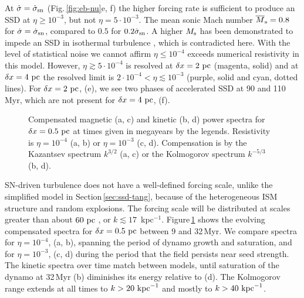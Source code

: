 \documentclass[preprint2]{aastex63}
\newcommand\SNr{\dot\sigma_{\rm sn}}
\newcommand\Ms{M_{\rm s}}
\newcommand\kpc{~ {\rm kpc}}
\newcommand\pc{~ {\rm pc}}
\newcommand\dx{ {\delta x}}
\begin{document}
 At $\dot\sigma=\SNr$ (Fig.\,\ref{fig:eb-nu}e, f) the higher forcing
 rate is sufficient to produce an SSD at $\eta\geq10^{-3}$, but not $\eta=5\cdot10^{-3}$.
     The mean sonic
 Mach number $\overline\Ms=0.8$ for $\dot\sigma=\SNr$,
 compared to $0.5$ for $0.2\SNr$.
 A higher $\Ms$ has been demonstrated to impede an SSD in isothermal turbulence
 \citep{Haugen:2004M}, which is contradicted here.
 With the level of statistical noise we cannot affirm $\eta\leq10^{-4}$
     exceeds numerical resistivity in this model. 
 However, $\eta\gtrsim5\cdot10^{-4}$ is
 resolved at $\dx=2\pc$ (magenta, solid) and 
 at $\dx=4\pc$ the resolved limit is $2\cdot10^{-4}<\eta\lesssim10^{-3}$
 (purple, solid and cyan, dotted lines).
 For $\dx=2\pc$, (e), we see two phases of accelerated SSD at 90 and
 110\,Myr, which are not present for $\dx=4\pc$, (f).

\begin{figure*}
\caption{
Compensated magnetic (a, c) and kinetic (b, d) power spectra for $\dx=0.5\pc$ at times given in megayears by
the legends.  Resistivity is 
 $\eta=10^{-4}$ (a, b) or $\eta=10^{-3}$ (c, d).
Compensation is by the Kazantsev spectrum 
$k^{3/2}$ (a, c) or the Kolmogorov spectrum $k^{-5/3}$ (b, d).
\label{fig:4power}}
\end{figure*}

 SN-driven turbulence does not have a well-defined forcing scale, unlike the
 simplified model in Section\,\ref{sec:ssd-tang}, because of the
 heterogeneous ISM structure and random explosions.
 The forcing scale will be distributed at scales greater than about $60\pc$
 \citep[][Table\,3]{HSSFG17}, or $k\lesssim17$~kpc$^{-1}$. 
 Figure\,\ref{fig:4power} shows the evolving compensated spectra for 
 $\dx=0.5\pc$ between 9 and 32\,Myr.
 We compare spectra for $\eta=10^{-4}$, (a, b), spanning the period of
 dynamo growth and saturation, and for $\eta=10^{-3}$, (c, d) during
 the period that the field
 persists near seed strength.
 The kinetic spectra over time match between models, until saturation
 of the dynamo at 32\,Myr (b) diminishes its energy relative to (d).
 The Kolmogorov range extends at all times to $k>20\kpc^{-1}$ and mostly 
 to $k>40\kpc^{-1}$. 
\end{document}
